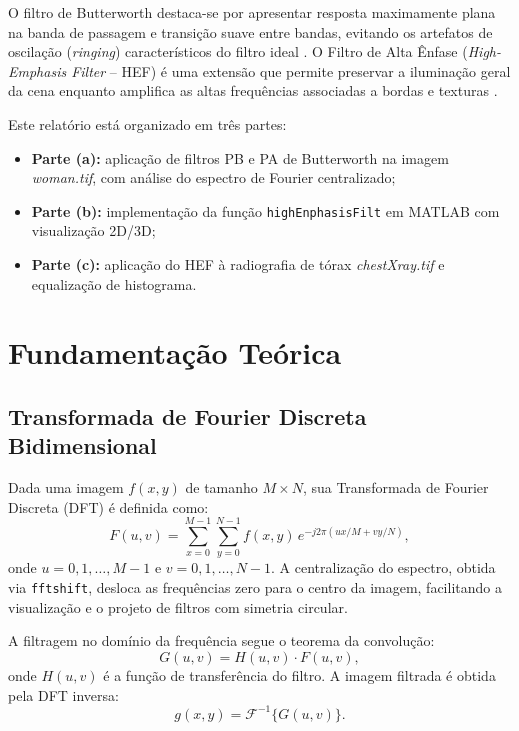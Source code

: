 \documentclass[12pt,a4paper,oneside,brazil,chapter=TITLE,section=TITLE]{abntex2}
\begin{document}
O filtro de Butterworth \cite{gonzalez2018} destaca-se por apresentar
resposta maximamente plana na banda de passagem e transi\c{c}\~ao
suave entre bandas, evitando os artefatos de oscila\c{c}\~ao
(\textit{ringing}) caracter\'isticos do filtro ideal
\cite{oppenheim1999}.
O Filtro de Alta \^Enfase (\textit{High-Emphasis Filter} -- HEF)
\'e uma extens\~ao que permite preservar a ilumina\c{c}\~ao geral
da cena enquanto amplifica as altas frequ\^encias associadas a bordas
e texturas \cite{gonzalez2018}.

Este relat\'orio est\'a organizado em tr\^es partes:
\begin{itemize}
  \item \textbf{Parte (a):} aplica\c{c}\~ao de filtros PB e PA de
        Butterworth na imagem \textit{woman.tif}, com an\'alise do
        espectro de Fourier centralizado;
  \item \textbf{Parte (b):} implementa\c{c}\~ao da fun\c{c}\~ao
        \texttt{highEnphasisFilt} em MATLAB com visualiza\c{c}\~ao
        2D/3D;
  \item \textbf{Parte (c):} aplica\c{c}\~ao do HEF \`a radiografia
        de t\'orax \textit{chestXray.tif} e equaliza\c{c}\~ao de
        histograma.
\end{itemize}

\chapter{Fundamenta\c{c}\~ao Te\'orica}

\section{Transformada de Fourier Discreta Bidimensional}

Dada uma imagem $f(x,y)$ de tamanho $M \times N$, sua Transformada de
Fourier Discreta (DFT) \'e definida como:
\begin{equation}
  F(u,v) = \sum_{x=0}^{M-1}\sum_{y=0}^{N-1}
            f(x,y)\,e^{-j2\pi(ux/M + vy/N)},
\end{equation}
onde $u = 0, 1, \ldots, M-1$ e $v = 0, 1, \ldots, N-1$.
A centraliza\c{c}\~ao do espectro, obtida via \texttt{fftshift}, desloca
as frequ\^encias zero para o centro da imagem, facilitando a visualiza\c{c}\~ao
e o projeto de filtros com simetria circular.

A filtragem no dom\'inio da frequ\^encia segue o teorema da
convolu\c{c}\~ao:
\begin{equation}
  G(u,v) = H(u,v) \cdot F(u,v),
\end{equation}
onde $H(u,v)$ \'e a fun\c{c}\~ao de transfer\^encia do filtro.
A imagem filtrada \'e obtida pela DFT inversa:
\begin{equation}
  g(x,y) = \mathcal{F}^{-1}\{G(u,v)\}.
\end{equation}
\end{document}
